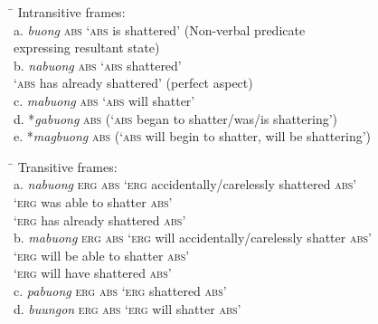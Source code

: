 \ea
\begin{tabbing}
\hspace{4.5cm} \= \kill
\label{bkm:Ref148453300}
Intransitive frames: \\
a.  \textit{buong} \textsc{abs} \>    ‘\textsc{abs} is shattered’  (Non-verbal predicate \\ \> expressing resultant state) \\
b.  \textit{nabuong} \textsc{abs} \> ‘\textsc{abs} shattered’ \\
     \> ‘\textsc{abs} has already shattered’ (perfect aspect) \\
c.  \textit{mabuong} \textsc{abs} \> ‘\textsc{abs} will shatter’ \\
d.  *\textit{gabuong} \textsc{abs} \> (‘\textsc{abs} began to shatter/was/is shattering') \\
e.  *\textit{magbuong} \textsc{abs} \> (‘\textsc{abs} will begin to shatter, will be shattering')
\end{tabbing}
\z
\ea
\begin{tabbing}
\hspace{4.5cm} \= \kill
Transitive frames: \\
a.  \textit{nabuong} \textsc{erg} \textsc{abs}  \> ‘\textsc{erg} accidentally/carelessly shattered \textsc{abs}’ \\
\>      ‘\textsc{erg} was able to shatter \textsc{abs}’ \\
\>      ‘\textsc{erg} has already shattered \textsc{abs}’ \\
b.  \textit{mabuong} \textsc{erg} \textsc{abs} \> ‘\textsc{erg} will accidentally/carelessly shatter \textsc{abs}’ \\
\>      ‘\textsc{erg} will be able to shatter \textsc{abs}’ \\
\>      ‘\textsc{erg} will have shattered \textsc{abs}’ \\
c.  \textit{pabuong} \textsc{erg} \textsc{abs} \> ‘\textsc{erg} shattered \textsc{abs}’ \\
d.  \textit{buungon} \textsc{erg} \textsc{abs} \> ‘\textsc{erg} will shatter \textsc{abs}’
\end{tabbing}
\z
\ea
\label{bkm:Ref148453302}
